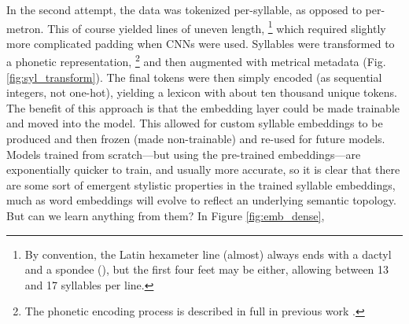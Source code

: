 \documentclass[
    twocolumn,
    hf,
]{ceurart}
\begin{document}
In the second attempt, the data was tokenized per-syllable, as opposed to
per-metron. This of course yielded lines of uneven length,%
%
\footnote{By convention, the Latin hexameter line (almost) always ends with a
    dactyl and a spondee (), but the first four feet may be
    either, allowing between 13 and 17 syllables per line.}
%
which required slightly more complicated padding when CNNs were used. Syllables
were transformed to a phonetic representation,%
%
\footnote{ The phonetic encoding process is described in full in previous work
    \cite{nagy_rhyme_2022}.}
%
and then augmented with metrical metadata (Fig. \ref{fig:syl_transform}). The
final tokens were then simply encoded (as sequential integers, not one-hot),
yielding a lexicon with about ten thousand unique tokens. The benefit of this
approach is that the embedding layer could be made trainable and moved into the
model. This allowed for custom syllable embeddings to be produced and then
frozen (made non-trainable) and re-used for future models. Models trained from
scratch---but using the pre-trained embeddings---are exponentially quicker to
train, and usually more accurate, so it is clear that there are some sort of
emergent stylistic properties in the trained syllable embeddings, much as word
embeddings will evolve to reflect an underlying semantic topology. But can we
learn anything from them? In Figure \ref{fig:emb_dense},%
%
\end{document}
